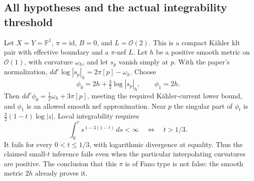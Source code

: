 \documentclass[10pt]{article}
\begin{document}
\subsection*{All hypotheses and the actual integrability threshold}
Let \(X=Y=\mathbb P^1\), \(\pi=\mathrm{id}\), \(B=0\), and \(L=\mathcal O(2)\). This is a compact Kähler klt pair with effective boundary and a \(\pi\)-nef \(L\). Let \(h\) be a positive smooth metric on \(\mathcal O(1)\), with curvature \(\omega_h\), and let \(s_p\) vanish simply at \(p\). With the paper’s normalization, \(dd^c\log|s_p|_h=2\pi[p]-\omega_h\). Choose \[\phi_0=2h+\tfrac32\log|s_p|_h,\qquad \phi_1=2h.\] Then \(dd^c\phi_0=\tfrac12\omega_h+3\pi[p]\), meeting the required Kähler-current lower bound, and \(\phi_1\) is an allowed smooth nef approximation. Near \(p\) the singular part of \(\phi_t\) is \(\tfrac32(1-t)\log|z|\). Local integrability requires \[\int_0^r s^{\,1-3(1-t)}\,ds<\infty
 \quad\Longleftrightarrow\quad t>1/3.\] It fails for every \(0<t\le1/3\), with logarithmic divergence at equality. Thus the claimed small-\(t\) inference fails even when the particular interpolating curvatures are positive. The conclusion that this \(\pi\) is of Fano type is not false: the smooth metric \(2h\) already proves it.\par
\end{document}
